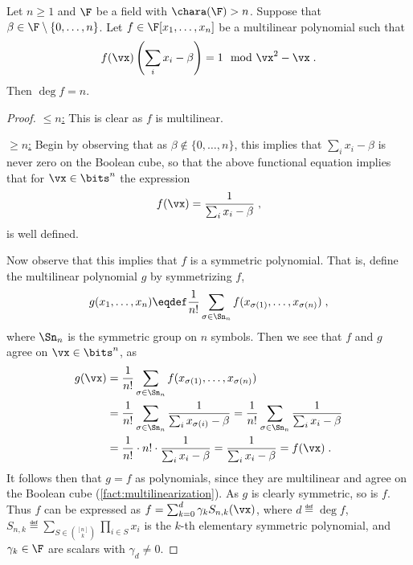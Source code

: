 \documentclass{toc}
\begin{document}
\begin{proposition}\label{res:subsetsum:deg}
        Let $n\ge 1$ and $\F$ be a field with $\chara(\F)>n$.  Suppose that $\beta\in \F\setminus\{0,\ldots,n\}$. Let $f\in\F[x_1,\ldots,x_n]$ be a multilinear polynomial such that
        \[
                f(\vx)\left(\sum_i x_i-\beta\right)=1 \mod \vx^2-\vx
                \;.
        \]
        Then $\deg f=n$.
\end{proposition}
\begin{proof}
        \uline{$\le n$:} This is clear as $f$ is multilinear.

        \uline{$\ge n$:} Begin by observing that as $\beta\notin\{0,\ldots,n\}$, this implies that $\sum_i x_i-\beta$ is never zero on the Boolean cube, so that the above functional equation implies that for $\vx\in\bits^n$ the expression
        \begin{align*}
                f(\vx)= \frac{1}{\sum_i x_i-\beta}
                \;,
        \end{align*}
        is well defined.

        Now observe that this implies that $f$ is a symmetric polynomial.  That is, define the multilinear polynomial $g$ by symmetrizing $f$,
        \begin{align*}
                g(x_1,\ldots,x_n)\eqdef \frac{1}{n!}\sum_{\sigma\in\Sn_n} f(x_{\sigma(1)},\ldots,x_{\sigma(n)})
                \;,
        \end{align*}
        where $\Sn_n$ is the symmetric group on $n$ symbols.  Then we see that $f$ and $g$ agree on $\vx\in\bits^n$, as
        \begin{align*}
                g(\vx)
                &=\frac{1}{n!}\sum_{\sigma\in\Sn_n} f(x_{\sigma(1)},\ldots,x_{\sigma(n)})\\
                &=\frac{1}{n!}\sum_{\sigma\in\Sn_n} \frac{1}{\sum_i x_{\sigma(i)}-\beta}
                =\frac{1}{n!}\sum_{\sigma\in\Sn_n} \frac{1}{\sum_i x_i-\beta}\\
                &=\frac{1}{n!}\cdot n!\cdot \frac{1}{\sum_i x_i-\beta}
                =\frac{1}{\sum_i x_i-\beta}=f(\vx)
                \;.
        \end{align*}
        It follows then that $g=f$ as polynomials, since they are multilinear and agree on the Boolean cube (\autoref{fact:multilinearization}).  As $g$ is clearly symmetric, so is $f$. Thus $f$ can be expressed as $f=\sum_{k=0}^d \gamma_k S_{n,k}(\vx)$, where $d\eqdef\deg f$, $S_{n,k}\eqdef \sum_{S\in\binom{[n]}{k}}\prod_{i\in S} x_i$ is the $k$-th elementary symmetric polynomial, and $\gamma_k\in\F$ are scalars with $\gamma_d\ne 0$.


\end{proof}
\end{document}
